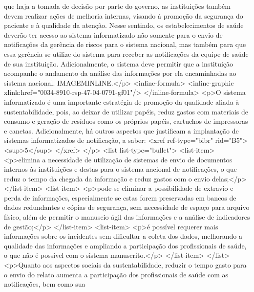         que haja a tomada de decisão por parte do governo, as instituições também devem realizar
        ações de melhoria internas, visando à promoção da segurança do paciente e à qualidade da
        atenção. Nesse sentindo, os estabelecimentos de saúde deverão ter acesso ao sistema
        informatizado não somente para o envio de notificações da gerência de riscos para o sistema
        nacional, mas também para que essa gerência se utilize do sistema para receber as
        notificações da equipe de saúde de sua instituição. Adicionalmente, o sistema deve permitir
        que a instituição acompanhe o andamento da análise das informações por ela encaminhadas ao
        sistema nacional. IMAGEMINLINE.</p>
          <inline-formula>
          <inline-graphic xlink:href="0034-8910-rsp-47-04-0791-gf01"/>
          </inline-formula>
      <p>O sistema informatizado é uma importante estratégia de promoção da qualidade aliada à
        sustentabilidade, pois, ao deixar de utilizar papéis, reduz gastos com materiais de consumo
        e geração de resíduos como os próprios papéis, cartuchos de impressoras e canetas.
        Adicionalmente, há outros aspectos que justificam a implantação de sistemas informatizados
        de notificação, a saber: <xref ref-type="bibr" rid="B5">
          <sup>5</sup>
        </xref>
      </p>
      <list list-type="bullet">
        <list-item>
          <p>elimina a necessidade de utilização de sistemas de envio de documentos internos às
            instituições e destas para o sistema nacional de notificações, o que reduz o tempo da
            chegada da informação e reduz gastos com o envio delas;</p>
        </list-item>
        <list-item>
          <p>pode-se eliminar a possibilidade de extravio e perda de informações, especialmente se
            estas forem preservadas em bancos de dados redundantes e cópias de segurança, sem
            necessidade de espaço para arquivo físico, além de permitir o manuseio ágil das
            informações e a análise de indicadores de gestão;</p>
        </list-item>
        <list-item>
          <p>é possível requerer mais informações sobre os incidentes sem dificultar a coleta dos
            dados, melhorando a qualidade das informações e ampliando a participação dos
            profissionais de saúde, o que não é possível com o sistema manuscrito.</p>
        </list-item>
      </list>
      <p>Quanto aos aspectos sociais da sustentabilidade, reduzir o tempo gasto para o envio do
        relato aumenta a participação dos profissionais de saúde com as notificações, bem como sua

